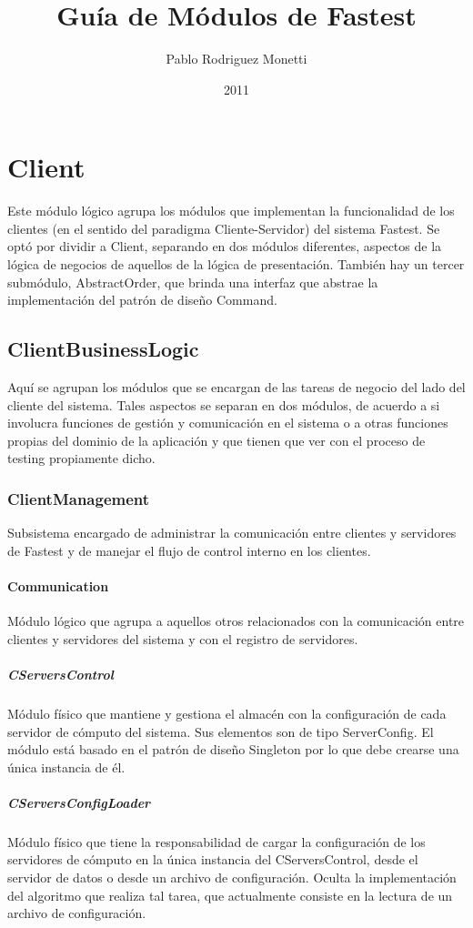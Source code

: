 \documentclass[a4paper,10pt]{report}
\title{Guía de Módulos de Fastest}
\author{Pablo Rodriguez Monetti}
\date{2011}
\begin{document}
 \maketitle





\chapter{Client}
Este módulo lógico agrupa los módulos que implementan la funcionalidad de los clientes (en el sentido del paradigma Cliente-Servidor) del sistema Fastest. Se optó por dividir a Client, separando en dos módulos diferentes, aspectos de la lógica de negocios de aquellos de la lógica de presentación. También hay un tercer submódulo, AbstractOrder, que brinda una interfaz que abstrae la implementación del patrón de diseño Command.
	\section{ClientBusinessLogic}
	Aquí se agrupan los módulos que se encargan de las tareas de negocio del lado del cliente del sistema. Tales aspectos se separan en dos módulos, de acuerdo a si involucra funciones de gestión y comunicación en el sistema o a otras funciones propias del dominio de la aplicación y que tienen que ver con el proceso de testing propiamente dicho.
		\subsection{ClientManagement}
			Subsistema encargado de administrar la comunicación entre clientes y servidores de Fastest y de manejar el flujo de control interno en los clientes.
			\subsubsection{Communication}	
			Módulo lógico que agrupa a aquellos otros relacionados con la comunicación entre clientes y servidores del sistema y con el registro de servidores.
				\paragraph{CServersControl}
				Módulo físico que mantiene y gestiona el almacén con la configuración de cada servidor de cómputo del sistema. Sus elementos son de tipo ServerConfig. El módulo está basado en el patrón de diseño Singleton por lo que debe crearse una única instancia de él.
				\paragraph{CServersConfigLoader}
				Módulo físico que tiene la responsabilidad de cargar la configuración de los servidores de cómputo en la única instancia del CServersControl, desde el servidor de datos o desde un archivo de configuración. Oculta la implementación del algoritmo que realiza tal tarea, que actualmente consiste en la lectura de un archivo de configuración.
\end{document}
